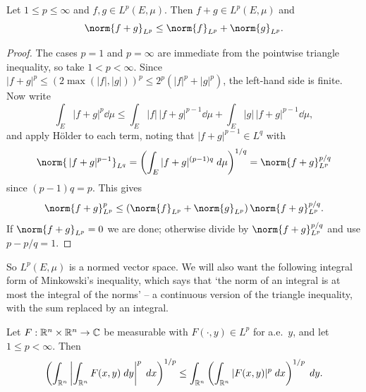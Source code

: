 \documentclass[a4paper]{scrartcl}
\begin{document}
\begin{theorem}\label{thm:minkowski}
	Let $1 \le p \le \infty$ and $f, g \in L^p(E,\mu)$. Then $f + g \in L^p(E,\mu)$ and
	$$\norm{f+g}_{L^p} \le \norm{f}_{L^p} + \norm{g}_{L^p}.$$
\end{theorem}

\begin{proof}
	The cases $p = 1$ and $p = \infty$ are immediate from the pointwise triangle inequality, so take $1 < p < \infty$. Since $|f+g|^p \le (2\max(|f|,|g|))^p \le 2^p(|f|^p + |g|^p)$, the left-hand side is finite. Now write
	$$\int_E |f+g|^p \dd\mu \le \int_E |f| \, |f+g|^{p-1} \dd \mu + \int_E |g|\, |f+g|^{p-1}\dd\mu,$$
	and apply H\"older to each term, noting that $|f+g|^{p-1} \in L^q$ with
	$$\norm{ \, |f+g|^{p-1}}_{L^q} = \left( \int_E |f+g|^{(p-1)q} \dd \mu\right)^{1/q} = \norm{f+g}_{L^p}^{p/q}$$
	since $(p-1)q = p$. This gives
	$$\norm{f+g}_{L^p}^p \le \left( \norm{f}_{L^p} + \norm{g}_{L^p}\right) \norm{f+g}_{L^p}^{p/q}.$$
	If $\norm{f+g}_{L^p} = 0$ we are done; otherwise divide by $\norm{f+g}_{L^p}^{p/q}$ and use $p - p/q = 1$.
\end{proof}

So $L^p(E,\mu)$ is a normed vector space. We will also want the following integral form of Minkowski's inequality, which says that `the norm of an integral is at most the integral of the norms' -- a continuous version of the triangle inequality, with the sum replaced by an integral.

\begin{lemma}\label{lem:minkint}
	Let $F : \mathbb{R}^n \times \mathbb{R}^n \to \mathbb{C}$ be measurable with $F(\cdot, y) \in L^p$ for a.e.\ $y$, and let $1 \le p < \infty$. Then
	$$\left( \int_{\mathbb{R}^n} \left| \int_{\mathbb{R}^n} F(x,y) \; d y \right|^p \; d x \right)^{1/p} \le \int_{\mathbb{R}^n} \left( \int_{\mathbb{R}^n} |F(x,y)|^p \; d x \right)^{1/p} \; d y.$$
\end{lemma}
\end{document}
